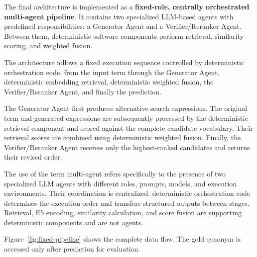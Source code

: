 The final architecture is implemented as a \textbf{fixed-role, centrally orchestrated multi-agent pipeline}. It contains two specialized LLM-based agents with predefined responsibilities: a Generator Agent and a Verifier/Reranker Agent. Between them, deterministic software components perform retrieval, similarity scoring, and weighted fusion.

The architecture follows a fixed execution sequence controlled by deterministic orchestration code, from the input term through the Generator Agent, deterministic embedding retrieval, deterministic weighted fusion, the Verifier/Reranker Agent, and finally the prediction.

The Generator Agent first produces alternative search expressions. The original term and generated expressions are subsequently processed by the deterministic retrieval component and scored against the complete candidate vocabulary. Their retrieval scores are combined using deterministic weighted fusion. Finally, the Verifier/Reranker Agent receives only the highest-ranked candidates and returns their revised order.

The use of the term multi-agent refers specifically to the presence of two specialized LLM agents with different roles, prompts, models, and execution environments. Their coordination is centralized: deterministic orchestration code determines the execution order and transfers structured outputs between stages. Retrieval, E5 encoding, similarity calculation, and score fusion are supporting deterministic components and are not agents.

Figure~\ref{fig:fixed-pipeline} shows the complete data flow. The gold synonym is accessed only after prediction for evaluation.

